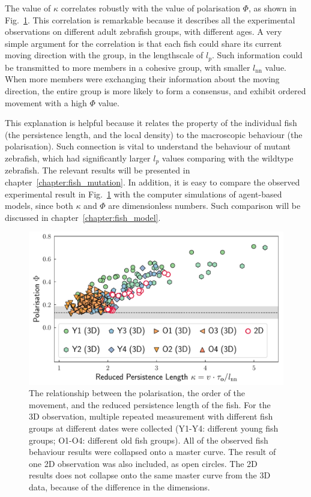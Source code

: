 \documentclass[11pt,twoside]{report}
\begin{document}
\noindent The value of $\kappa$ correlates robustly with the value of polarisation $\Phi$, as shown in Fig.~\ref{fig:states-1d}.
This correlation is remarkable because it describes all the experimental observations on different adult zebrafish groups, with different ages.
A very simple argument for the correlation is that each fish could share its current moving direction with the group, in the lengthscale of $l_p$. Such information could be transmitted to more members in a cohesive group, with smaller $l_\mathrm{nn}$ value. When more members were exchanging their information about the moving direction, the entire group is more likely to form a consensus, and exhibit ordered movement with a high $\Phi$ value.

This explanation is helpful because it relates the property of the individual fish (the persistence length, and the local density) to the macroscopic behaviour (the polarisation).
Such connection is vital to understand the behaviour of mutant zebrafish, which had significantly larger $l_p$ values comparing with the wildtype zebrafish. The relevant results will be presented in chapter~\ref{chapter:fish_mutation}.
In addition, it is easy to compare the observed experimental result in Fig.~\ref{fig:states-1d} with the computer simulations of agent-based models, since both $\kappa$ and $\Phi$ are dimensionless numbers. Such comparison will be discussed in chapter~\ref{chapter:fish_model}.


 \begin{figure}
  \includegraphics[width=\linewidth,outer]{states-1d}
  \caption[The behaviour of 50 zebrafish described by reduced persistence length]{
  	The relationship between the polarisation, the order of the movement, and the reduced persistence length of the fish. For the 3D observation, multiple repeated measurement with different fish groups at different dates were collected (Y1-Y4: different young fish groups; O1-O4: different old fish groups).
  	All of the observed fish behaviour results were collapsed onto a master curve. The result of one 2D observation was also included, as open circles. The 2D results does not collapse onto the same master curve from the 3D data, because of the difference in the dimensions.
  }
  \label{fig:states-1d}
\end{figure}
\end{document}
